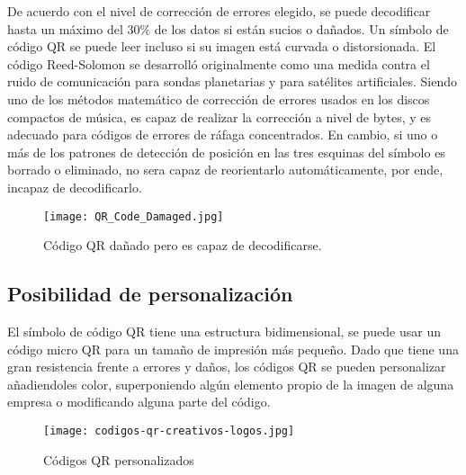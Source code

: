 De acuerdo con el nivel de corrección de errores elegido, se puede decodificar hasta un máximo del 30\% de los datos si están sucios o dañados. Un símbolo de código QR se puede leer incluso si su imagen está curvada o distorsionada. \cite{2012_DENSO}
El código Reed-Solomon se desarrolló originalmente como una medida contra el ruido de comunicación para sondas planetarias y para satélites artificiales. Siendo uno de los métodos matemático de corrección de errores usados en los discos compactos de música, es capaz de realizar la corrección a nivel de bytes, y es adecuado para códigos de errores de ráfaga concentrados.\cite{2004_Ohmsha,2008_Conf}
En cambio, si uno o más de los patrones de detección de posición en las tres esquinas del símbolo es borrado o eliminado, no sera capaz de reorientarlo automáticamente, por ende, incapaz de decodificarlo.
\begin{figure} 
\centering
\texttt{[image: QR\_Code\_Damaged.jpg]}
\caption{Código QR dañado pero es capaz de decodificarse.}
\label{fig:ErrorCorrectionCode1}
\end{figure} 

\subsection{Posibilidad de personalización}
El símbolo de código QR tiene una estructura bidimensional, se puede usar un código micro QR para un tamaño de impresión más pequeño.
Dado que tiene una gran resistencia frente a errores y daños, los códigos QR se pueden personalizar añadiendoles color, superponiendo algún elemento propio de la imagen de alguna empresa o modificando alguna parte del código.\cite{2014_Chang,2012_Encinas}
\begin{figure} 
\centering
\texttt{[image: codigos-qr-creativos-logos.jpg]}
\caption{Códigos QR personalizados}
\label{fig:qrpersonalizados}
\end{figure} 


